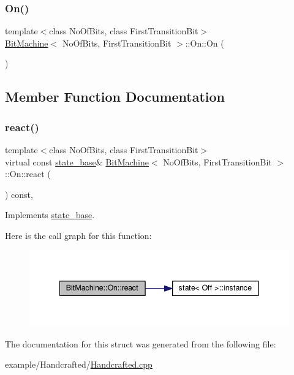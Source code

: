 \subsubsection{\texorpdfstring{On()}{On()}}
{\footnotesize\ttfamily template$<$class No\+Of\+Bits, class First\+Transition\+Bit$>$ \\
\mbox{\hyperlink{struct_bit_machine}{Bit\+Machine}}$<$ No\+Of\+Bits, First\+Transition\+Bit $>$\+::On\+::\+On (\begin{DoxyParamCaption}{ }\end{DoxyParamCaption})\hspace{0.3cm}{\ttfamily [inline]}}



\subsection{Member Function Documentation}
\mbox{\label{struct_bit_machine_1_1_on_a8ec83d08486a1e75c988953e882f8f7f}} 
\subsubsection{\texorpdfstring{react()}{react()}}
{\footnotesize\ttfamily template$<$class No\+Of\+Bits, class First\+Transition\+Bit$>$ \\
virtual const \mbox{\hyperlink{classstate__base}{state\+\_\+base}}\& \mbox{\hyperlink{struct_bit_machine}{Bit\+Machine}}$<$ No\+Of\+Bits, First\+Transition\+Bit $>$\+::On\+::react (\begin{DoxyParamCaption}\item[{const \mbox{\hyperlink{struct_ev_flip_bit}{Ev\+Flip\+Bit}} \&}]{ }\end{DoxyParamCaption}) const\hspace{0.3cm}{\ttfamily [inline]}, {\ttfamily [virtual]}}



Implements \mbox{\hyperlink{classstate__base_a2ee5b06850f92dd17ff82907bed15308}{state\+\_\+base}}.

Here is the call graph for this function\+:
\nopagebreak
\begin{figure}[H]
\begin{center}
\leavevmode
\includegraphics[width=341pt]{struct_bit_machine_1_1_on_a8ec83d08486a1e75c988953e882f8f7f_cgraph}
\end{center}
\end{figure}


The documentation for this struct was generated from the following file\+:\begin{DoxyCompactItemize}
\item 
example/\+Handcrafted/\mbox{\hyperlink{_handcrafted_8cpp}{Handcrafted.\+cpp}}\end{DoxyCompactItemize}

